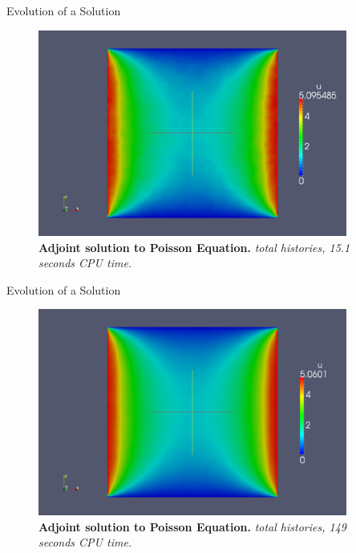 \documentclass{beamer}
\begin{document}
\begin{frame}{Evolution of a Solution}

  \begin{figure}[h!]
    \begin{center}
      \includegraphics[width=4in]{adjoint_1000000.png}
    \end{center}
    \caption{\textbf{Adjoint solution to Poisson Equation.}
      \textit{ total histories, 15.1 seconds CPU time.} }
  \end{figure}

\end{frame}

\begin{frame}{Evolution of a Solution}

  \begin{figure}[h!]
    \begin{center}
      \includegraphics[width=4in]{adjoint_10000000.png}
    \end{center}
    \caption{\textbf{Adjoint solution to Poisson Equation.}
      \textit{ total histories, 149 seconds CPU time.} }
  \end{figure}

\end{frame}
\end{document}
